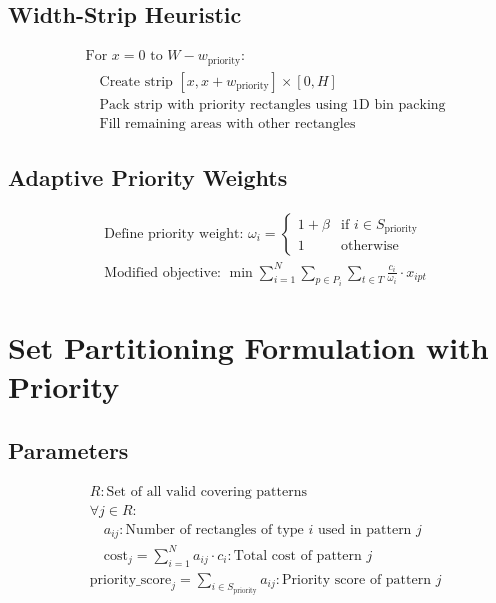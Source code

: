 \documentclass{article}
\begin{document}
\subsection{Width-Strip Heuristic}
\begin{align*}
&\text{For } x = 0 \text{ to } W - w_{\text{priority}}: \\
&\quad \text{Create strip } [x, x + w_{\text{priority}}] \times [0, H] \\
&\quad \text{Pack strip with priority rectangles using 1D bin packing} \\
&\quad \text{Fill remaining areas with other rectangles}
\end{align*}

\subsection{Adaptive Priority Weights}
\begin{align*}
&\text{Define priority weight: } \omega_i = 
\begin{cases}
1 + \beta & \text{if } i \in S_{\text{priority}} \\
1 & \text{otherwise}
\end{cases} \\
&\text{Modified objective: } \min \sum_{i=1}^{N} \sum_{p \in P_i} \sum_{t \in T} \frac{c_i}{\omega_i} \cdot x_{ipt}
\end{align*}

\section{Set Partitioning Formulation with Priority}

\subsection{Parameters}
\begin{align*}
& R: \text{Set of all valid covering patterns} \\
& \forall j \in R: \\
& \quad a_{ij}: \text{Number of rectangles of type } i \text{ used in pattern } j \\
& \quad \text{cost}_j = \sum_{i=1}^{N} a_{ij} \cdot c_i: \text{Total cost of pattern } j \\
& \text{priority\_score}_j = \sum_{i \in S_{\text{priority}}} a_{ij}: \text{Priority score of pattern } j
\end{align*}
\end{document}
